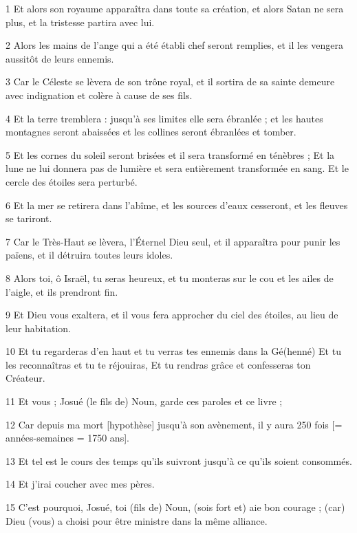 \par 1 Et alors son royaume apparaîtra dans toute sa création, et alors Satan ne sera plus, et la tristesse partira avec lui.
\par 2 Alors les mains de l'ange qui a été établi chef seront remplies, et il les vengera aussitôt de leurs ennemis.
\par 3 Car le Céleste se lèvera de son trône royal, et il sortira de sa sainte demeure avec indignation et colère à cause de ses fils.
\par 4 Et la terre tremblera : jusqu'à ses limites elle sera ébranlée ; et les hautes montagnes seront abaissées et les collines seront ébranlées et tomber.
\par 5 Et les cornes du soleil seront brisées et il sera transformé en ténèbres ; Et la lune ne lui donnera pas de lumière et sera entièrement transformée en sang. Et le cercle des étoiles sera perturbé.
\par 6 Et la mer se retirera dans l'abîme, et les sources d'eaux cesseront, et les fleuves se tariront.
\par 7 Car le Très-Haut se lèvera, l'Éternel Dieu seul, et il apparaîtra pour punir les païens, et il détruira toutes leurs idoles.
\par 8 Alors toi, ô Israël, tu seras heureux, et tu monteras sur le cou et les ailes de l'aigle, et ils prendront fin.
\par 9 Et Dieu vous exaltera, et il vous fera approcher du ciel des étoiles, au lieu de leur habitation.
\par 10 Et tu regarderas d'en haut et tu verras tes ennemis dans la Gé(henné) Et tu les reconnaîtras et tu te réjouiras, Et tu rendras grâce et confesseras ton Créateur.
\par 11 Et vous ; Josué (le fils de) Noun, garde ces paroles et ce livre ;
\par 12 Car depuis ma mort [hypothèse] jusqu'à son avènement, il y aura 250 fois [= années-semaines = 1750 ans].
\par 13 Et tel est le cours des temps qu'ils suivront jusqu'à ce qu'ils soient consommés.
\par 14 Et j'irai coucher avec mes pères.
\par 15 C'est pourquoi, Josué, toi (fils de) Noun, (sois fort et) aie bon courage ; (car) Dieu (vous) a choisi pour être ministre dans la même alliance.


